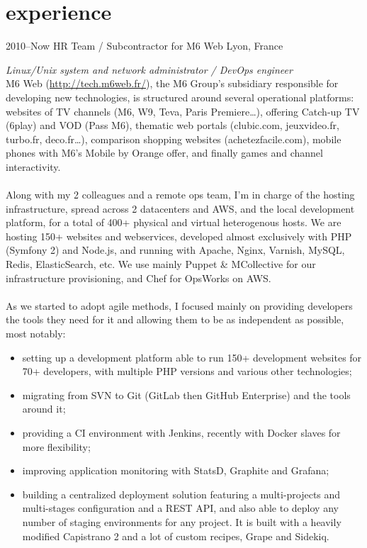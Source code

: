 \documentclass[]{friggeri-cv} %
\begin{document}
\section{experience}

\begin{entrylist}
\entry
{2010--Now}
{HR Team / Subcontractor for M6 Web}
{Lyon, France}
{\emph{Linux/Unix system and network administrator / DevOps engineer} \\
M6 Web (\url{http://tech.m6web.fr/}), the M6 Group’s subsidiary responsible for developing new technologies, is structured around several operational platforms: websites of TV channels (M6, W9, Teva, Paris Premiere\dots), offering Catch-up TV (6play) and VOD (Pass M6), thematic web portals (clubic.com, jeuxvideo.fr, turbo.fr, deco.fr\dots), comparison shopping websites (achetezfacile.com), mobile phones with M6’s Mobile by Orange offer, and finally games and channel interactivity. \\
\\
Along with my 2 colleagues and a remote ops team, I'm in charge of the hosting infrastructure, spread across 2 datacenters and AWS, and the local development platform, for a total of 400+ physical and virtual heterogenous hosts. We are hosting 150+ websites and webservices, developed almost exclusively with PHP (Symfony 2) and Node.js, and running with Apache, Nginx, Varnish, MySQL, Redis, ElasticSearch, etc. We use mainly Puppet \& MCollective for our infrastructure provisioning, and Chef for OpsWorks on AWS. \\
\\
As we started to adopt agile methods, I focused mainly on providing developers the tools they need for it and allowing them to be as independent as possible, most notably:
\begin{itemize}
  \item setting up a development platform able to run 150+ development websites for 70+ developers, with multiple PHP versions and various other technologies;
  \item migrating from SVN to Git (GitLab then GitHub Enterprise) and the tools around it;
  \item providing a CI environment with Jenkins, recently with Docker slaves for more flexibility;
  \item improving application monitoring with StatsD, Graphite and Grafana;
  \item building a centralized deployment solution featuring a multi-projects and multi-stages configuration and a REST API, and also able to deploy any number of staging environments for any project. It is built with a heavily modified Capistrano 2 and a lot of custom recipes, Grape and Sidekiq.
\end{itemize}}


\end{entrylist}
\end{document}
